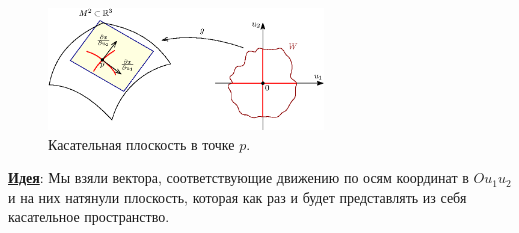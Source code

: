 \documentclass[12pt]{article}
\theoremstyle{definition}
\begin{document}
\begin{figure}[H]
	\centering
	\includegraphics[width=0.65\textwidth]{19_12.eps}
	\caption{Касательная плоскость в точке $p$.}
	\label{19_12}
\end{figure}

\textbf{\uline{Идея}}: Мы взяли вектора, соответствующие движению по осям координат в $Ou_1u_2$ и на них натянули плоскость, которая как раз и будет представлять из себя касательное пространство.
\end{document}
